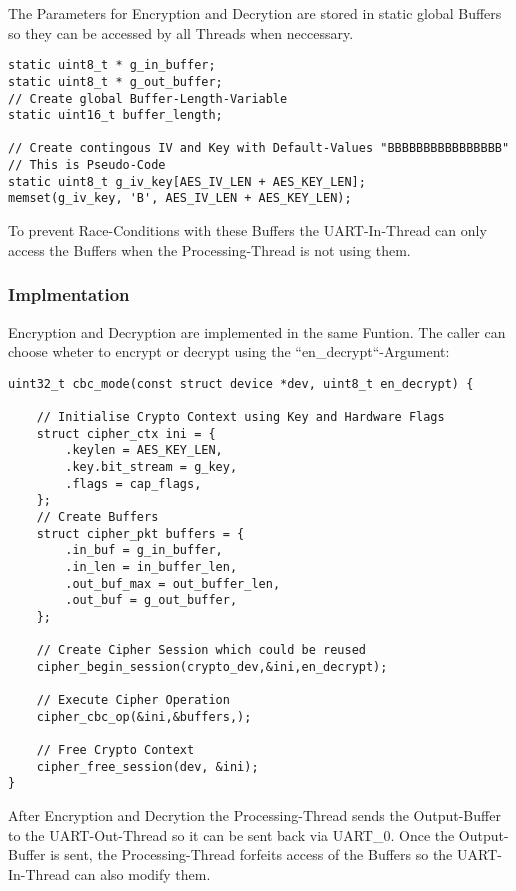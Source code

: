 The Parameters for Encryption and Decrytion are stored in static global
Buffers so they can be accessed by all Threads when neccessary.

\begin{lstlisting}[style=CStyle,caption=Global Buffers for Encryption and Decryption]
static uint8_t * g_in_buffer;
static uint8_t * g_out_buffer;
// Create global Buffer-Length-Variable
static uint16_t buffer_length;

// Create contingous IV and Key with Default-Values "BBBBBBBBBBBBBBBB"
// This is Pseudo-Code
static uint8_t g_iv_key[AES_IV_LEN + AES_KEY_LEN];
memset(g_iv_key, 'B', AES_IV_LEN + AES_KEY_LEN);
\end{lstlisting}

To prevent Race-Conditions with these Buffers the UART-In-Thread can only
access the Buffers when the Processing-Thread is not using them.

\pagebreak

\subsubsection{Implmentation}

Encryption and Decryption are implemented in the same Funtion.
The caller can choose wheter to encrypt or decrypt using the
``en\_decrypt``-Argument:

\begin{lstlisting}[style=CStyle,caption=Encryption and Decryption Pseudo-Code]
uint32_t cbc_mode(const struct device *dev, uint8_t en_decrypt) {

	// Initialise Crypto Context using Key and Hardware Flags
	struct cipher_ctx ini = {
		.keylen = AES_KEY_LEN,
		.key.bit_stream = g_key,
		.flags = cap_flags,
	};
	// Create Buffers
	struct cipher_pkt buffers = {
		.in_buf = g_in_buffer,
		.in_len = in_buffer_len,
		.out_buf_max = out_buffer_len,
		.out_buf = g_out_buffer,
	};

	// Create Cipher Session which could be reused
	cipher_begin_session(crypto_dev,&ini,en_decrypt);

	// Execute Cipher Operation
	cipher_cbc_op(&ini,&buffers,);

	// Free Crypto Context
	cipher_free_session(dev, &ini);
}
\end{lstlisting}

After Encryption and Decrytion the Processing-Thread sends the Output-Buffer
to the UART-Out-Thread so it can be sent back via UART\_0.
Once the Output-Buffer is sent, the Processing-Thread forfeits access of
the Buffers so the UART-In-Thread can also modify them.
